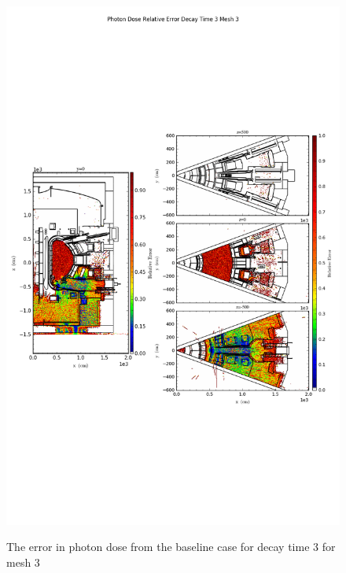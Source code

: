 \begin{figure}[ht!]
\centering
\includegraphics[trim={0cm 9cm 0cm 10cm},clip,scale=0.75]{../plots/final_model_nob4c/Photon_Dose_Relative_Error_Decay_Time_3_Mesh_3.png}
\label{fig:photons_dc3_no4bc_m3_error}
\caption{The error in photon dose from the baseline case for decay time 3 for mesh 3}
\end{figure}
